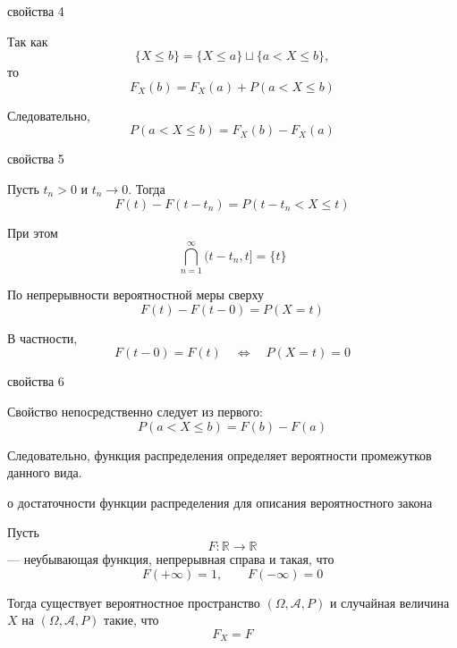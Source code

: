 \documentclass[12pt,a4paper]{article}
\begin{document}
\begin{proofbox}{свойства 4}

Так как
\[
\{X\leq b\}
=
\{X\leq a\}\sqcup\{a<X\leq b\},
\]
то
\[
F_X(b)
=
F_X(a)+P(a<X\leq b)
\]

Следовательно,
\[
P(a<X\leq b)=F_X(b)-F_X(a)
\]

\end{proofbox}

\begin{proofbox}{свойства 5}

Пусть $t_n>0$ и $t_n\to0$. Тогда
\[
F(t)-F(t-t_n)
=
P(t-t_n<X\leq t)
\]

При этом
\[
\bigcap_{n=1}^{\infty}(t-t_n,t]=\{t\}
\]

По непрерывности вероятностной меры сверху
\[
F(t)-F(t-0)=P(X=t)
\]

В частности,
\[
F(t-0)=F(t)
\quad\Longleftrightarrow\quad
P(X=t)=0
\]

\end{proofbox}

\begin{proofbox}{свойства 6}

Свойство непосредственно следует из первого:
\[
P(a<X\leq b)=F(b)-F(a)
\]

Следовательно, функция распределения определяет вероятности промежутков данного вида.

\end{proofbox}

\begin{theorem}{о достаточности функции распределения для описания вероятностного закона}

Пусть
\[
F:\mathbb{R}\to\mathbb{R}
\]
--- неубывающая функция, непрерывная справа и такая, что
\[
F(+\infty)=1,
\qquad
F(-\infty)=0
\]

Тогда существует вероятностное пространство $(\Omega,\mathcal{A},P)$ и случайная величина $X$ на $(\Omega,\mathcal{A},P)$ такие, что
\[
F_X=F
\]

\end{theorem}
\end{document}
